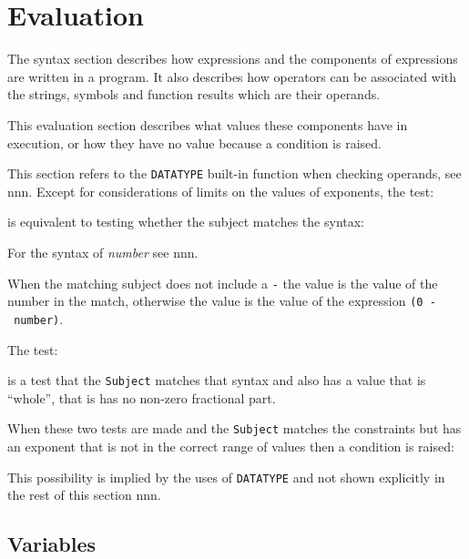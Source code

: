 \chapter{Evaluation}\label{evaluation}

The syntax section describes how expressions and the components of
expressions are written in a program. It also describes how operators
can be associated with the strings, symbols and function results which
are their operands.

This evaluation section describes what values these components have in
execution, or how they have no value because a condition is raised.

This section refers to the \texttt{DATATYPE} built-in function when
checking operands, see nnn. Except for considerations of limits on the
values of exponents, the test:



is equivalent to testing whether the subject matches the syntax:



For the syntax of \emph{number} see nnn.

When the matching subject does not include a
\texttt{\textquotesingle{}-\textquotesingle{}} the value is the value of
the number in the match, otherwise the value is the value of the
expression \texttt{(0\ -\ number)}.

The test:



is a test that the \texttt{Subject} matches that syntax and also has a
value that is ``whole'', that is has no non-zero fractional part.

When these two tests are made and the \texttt{Subject} matches the
constraints but has an exponent that is not in the correct range of
values then a condition is raised:



This possibility is implied by the uses of \texttt{DATATYPE} and not
shown explicitly in the rest of this section nnn.

\section{Variables}\label{variables}

